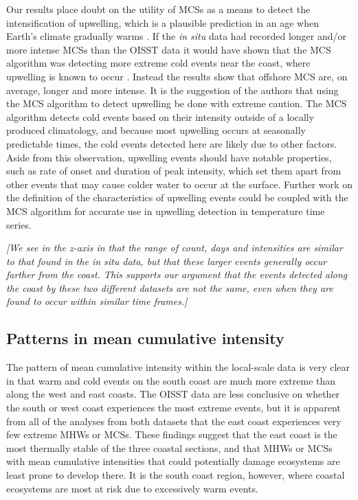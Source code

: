\documentclass[a4paper,10pt,review]{elsarticle}
\begin{document}
Our results place doubt on the utility of MCSs as a means to detect the intensification of upwelling, which is a plausible prediction in an age when Earth's climate gradually warms \citep{Garcia-Reyes2015}. If the \emph{in situ} data had recorded longer and/or more intense MCSs than the OISST data it would have shown that the MCS algorithm was detecting more extreme cold events near the coast, where upwelling is known to occur \citep{Lutjeharms2000, Hutchings2009}. Instead the results show that offshore MCS are, on average, longer and more intense. It is the suggestion of the authors that using the MCS algorithm to detect upwelling be done with extreme caution. The MCS algorithm detects cold events based on their intensity outside of a locally produced climatology, and because most upwelling occurs at seasonally predictable times, the cold events detected here are likely due to other factors. Aside from this observation, upwelling events should have notable properties, such as rate of onset and duration of peak intensity, which set them apart from other events that may cause colder water to occur at the surface. Further work on the definition of the characteristics of upwelling events could be coupled with the MCS algorithm for accurate use in upwelling detection in temperature time series.

\emph{[We see in the \emph{z}-axis in  that the range of count, days and intensities are similar to that found in the \emph{in situ} data, but that these larger events generally occur farther from the coast. This supports our argument that the events detected along the coast by these two different datasets are not the same, even when they are found to occur within similar time frames.]}

\subsection{Patterns in mean cumulative intensity}
The pattern of mean cumulative intensity within the local-scale data is very clear in that warm and cold events on the south coast are much more extreme than along the west and east coasts. The OISST data are less conclusive on whether the south or west coast experiences the most extreme events, but it is apparent from all of the analyses from both datasets that the east coast experiences very few extreme MHWs or MCSs. These findings suggest that the east coast is the most thermally stable of the three coastal sections, and that MHWs or MCSs with mean cumulative intensities that could potentially damage ecosystems are least prone to develop there. It is the south coast region, however, where coastal ecosystems are most at risk due to excessively warm events.
\end{document}
